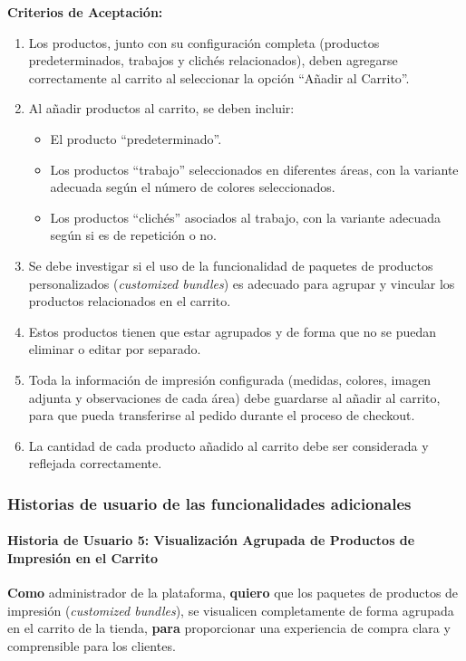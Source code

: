 \documentclass[11pt]{article}
\newcommand{\subsubsubsection}[1]{\paragraph{#1}}
\begin{document}
\vspace{0.5cm}
\textbf{Criterios de Aceptación:}
\begin{enumerate}[label=\arabic*.]
    \item Los productos, junto con su configuración completa (productos predeterminados, trabajos y clichés relacionados), deben agregarse correctamente al carrito al seleccionar la opción ``Añadir al Carrito''.
    \item Al añadir productos al carrito, se deben incluir:
          \begin{itemize}
              \item El producto ``predeterminado''.
              \item Los productos ``trabajo'' seleccionados en diferentes áreas, con la variante adecuada según el número de colores seleccionados.
              \item Los productos ``clichés'' asociados al trabajo, con la variante adecuada según si es de repetición o no.
          \end{itemize}
    \item Se debe investigar si el uso de la funcionalidad de paquetes de productos personalizados (\textit{customized bundles}) es adecuado para agrupar y vincular los productos relacionados en el carrito.
    \item Estos productos tienen que estar agrupados y de forma que no se puedan eliminar o editar por separado.
    \item Toda la información de impresión configurada (medidas, colores, imagen adjunta y observaciones de cada área) debe guardarse al añadir al carrito, para que pueda transferirse al pedido durante el proceso de checkout.
    \item La cantidad de cada producto añadido al carrito debe ser considerada y reflejada correctamente.
\end{enumerate}

\subsubsection{Historias de usuario de las funcionalidades adicionales}

\subsubsubsection{Historia de Usuario 5: Visualización Agrupada de Productos de Impresión en el Carrito}\label{sec:historia5}

\textbf{Como} administrador de la plataforma,
\textbf{quiero} que los paquetes de productos de impresión (\textit{customized bundles}), se visualicen completamente de forma agrupada en el carrito de la tienda,
\textbf{para} proporcionar una experiencia de compra clara y comprensible para los clientes.
\end{document}

